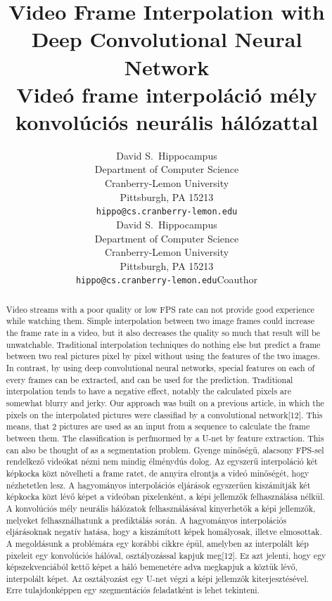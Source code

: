 \documentclass{article}
\title{Video Frame Interpolation with Deep Convolutional Neural Network 
\\Videó frame interpoláció mély konvolúciós neurális hálózattal}
\author{
  David S.~Hippocampus\\
  Department of Computer Science\\
  Cranberry-Lemon University\\
  Pittsburgh, PA 15213 \\
  \texttt{hippo@cs.cranberry-lemon.edu} \\
  \And
  David S.~Hippocampus\\
  Department of Computer Science\\
  Cranberry-Lemon University\\
  Pittsburgh, PA 15213 \\
  \texttt{hippo@cs.cranberry-lemon.edu}Coauthor \\
}
\begin{document}

\maketitle

\begin{abstract}
Video streams with a poor quality or low FPS rate can not provide good experience while watching them. Simple interpolation between two image frames could increase the frame rate in a video, but it also decreases the quality so much that result will be unwatchable. Traditional interpolation techniques do nothing else but predict a frame between two real pictures pixel by pixel without using the features of the two images. In contrast, by using deep convolutional neural networks, special features on each of every frames can be extracted, and can be used for the prediction.  Traditional interpolation tends to have a negative effect, notably the calculated pixels are somewhat blurry and jerky. Our approach was built on a previous article, in which the pixels on the interpolated pictures were classifiad by a convolutional network[12]. This means, that 2 pictures are used as an input from a sequence to calculate the frame between them. The classification is perfmormed by a U-net by feature extraction. This can also be thought of as a segmentation problem.
\linebreak
\linebreak
Gyenge minőségű, alacsony FPS-sel rendelkező videókat nézni nem mindig élménydús dolog. Az egyszerű interpoláció két képkocka közt növelheti a frame ratet, de annyira elrontja a videó minőségét, hogy nézhetetlen lesz. A hagyományos interpolációs eljárások egyszerűen kiszámítják két képkocka közt lévő képet a videóban pixelenként, a képi jellemzők felhasználása nélkül. A konvolúciós mély neurális hálózatok felhasználásával kinyerhetők a képi jellemzők, melyeket felhasználhatunk a prediktálás során. A hagyományos interpolációs eljárásoknak negatív hatása, hogy a kiszámított képek homályosak, illetve elmosottak. A megoldásunk a problémára egy korábbi cikkre épül, amelyben az interpolált kép pixeleit egy konvolúciós hálóval, osztályozással kapjuk meg[12]. Ez azt jelenti, hogy egy képszekvenciából kettő képet a háló bemenetére adva megkapjuk a köztük lévő, interpolált képet. Az osztályozást egy U-net végzi a képi jellemzők kiterjesztésével. Erre tulajdonképpen egy szegmentációs feladatként is lehet tekinteni.
\end{abstract}
\end{document}
